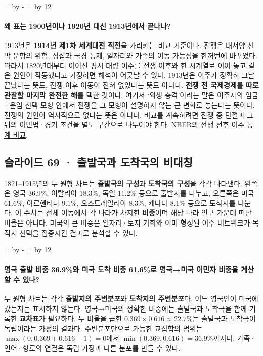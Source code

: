 \documentclass[10pt,a4paper]{article}
\newcommand{\ReserveQuestionSpace}{%
  \par\begingroup
  \dimen0=\pagegoal \advance\dimen0 by -\pagetotal
  \dimen2=\baselineskip \multiply\dimen2 by 12
  \ifdim\dimen0<\dimen2 \newpage\fi
  \endgroup}
\begin{document}
\ReserveQuestionSpace
\paragraph{왜 표는 1900년이나 1920년 대신 1913년에서 끝나나?}
1913년은 \textbf{1914년 제1차 세계대전 직전}을 가리키는 비교 기준이다. 전쟁은 대서양 선박 운항의 위험, 징집과 국경 통제, 일자리와 가족의 이동 가능성을 한꺼번에 바꾸었다. 따라서 1820년대부터 이어진 평시 대량 이주를 전쟁 이후와 한 시계열로 이어 놓고 같은 원인이 작동했다고 가정하면 해석이 어긋날 수 있다. 1913년은 이주가 정확히 그날 끝났다는 뜻도, 전쟁 이후 이동이 전혀 없었다는 뜻도 아니다. \textbf{전쟁 전 국제경제를 따로 관찰할 마지막 완전한 해}를 택한 것이다. 여기서 ‘외생 충격’이라는 말은 이주자의 임금·운임 선택 모형 안에서 전쟁을 그 모형이 설명하지 않는 큰 변화로 놓는다는 뜻이다. 전쟁의 원인이 역사적으로 없다는 뜻은 아니다. 비교를 계속하려면 전쟁 중 단절과 그 뒤의 이민법·경기 조건을 별도 구간으로 나누어야 한다. \href{https://www.nber.org/system/files/chapters/c5270/c5270.pdf}{NBER의 전쟁 전후 이주 통계 비교}.\par

\subsection{슬라이드 69 · 출발국과 도착국의 비대칭}
1821–1915년의 두 원형 차트는 \textbf{출발국의 구성}과 \textbf{도착국의 구성}을 각각 나타낸다. 왼쪽은 영국 36.9\%, 이탈리아 18.3\%, 독일 11.2\% 등으로 출발지를 나누고, 오른쪽은 미국 61.6\%, 아르헨티나 9.1\%, 오스트레일리아 8.3\%, 캐나다 8.1\% 등으로 도착지를 나눈다. 이 수치는 전체 이동에서 각 나라가 차지한 \textbf{비중}이며 해당 나라 인구 가운데 떠난 비율은 아니다. 미국의 큰 비중은 일자리·토지 기회와 이미 형성된 이주 네트워크가 목적지 선택을 집중시킨 결과로 분석할 수 있다.\par

\ReserveQuestionSpace
\paragraph{영국 출발 비중 36.9\%와 미국 도착 비중 61.6\%로 영국→미국 이민자 비중을 계산할 수 있나?}
두 원형 차트는 각각 \textbf{출발지의 주변분포}와 \textbf{도착지의 주변분포}다. 어느 영국인이 미국에 갔는지는 표시하지 않는다. 영국→미국의 정확한 비중에는 출발국과 도착국을 함께 기록한 \textbf{교차표}가 필요하다. 두 비율을 곱한 $0.369\times0.616\approx22.7\%$는 출발국과 도착국이 독립이라는 가정의 결과다. 주변분포만으로 가능한 교집합의 범위는 $\max(0,0.369+0.616-1)=0$에서 $\min(0.369,0.616)=36.9\%$까지다. 가족·언어·항로의 연결은 독립 가정과 다른 분포를 만들 수 있다.\par
\end{document}
